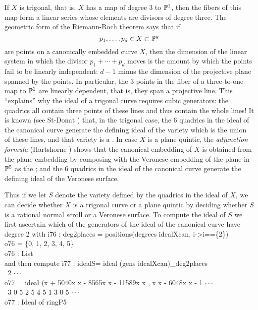 If $X$ is trigonal, that is, $X$ has a map of degree 3 to $\P^1$,
then the fibers of this map form a linear series whose elements
are divisors of degree three. The geometric form
of the Riemann-Roch theorem says that if 
$$
p_1,\dots,p_d\in X\subset \P^g
$$
are points on a canonically embedded curve $X$,
then the dimension of the linear system in which the divisor
$p_1+\cdots+p_d$ moves is the amount by which the points fail
to be linearly independent: $d-1$ minus the dimension of the 
projective plane spanned by the points.
In particular, the 3 points in the fiber of a three-to-one
map to $\P^1$ are linearly dependent, that is,
they span a projective line.
This ``explains'' why the ideal of a
trigonal curve requires cubic generators: the quadrics all 
contain three points of these lines and thus contain the whole
lines! It is known (see St-Donat \cite{s-d}) that, in the 
trigonal case, the 6 quadrics in the ideal of the canonical curve
generate the defining ideal of the variety which is the union of these
lines, and that variety is a .
In case $X$ is a plane quintic, the {\it adjunction formula\/}
(Hartshorne \cite[II.8.20.3]{Hartshorne}) 
shows that the canonical embedding of $X$ is
obtained from the plane embedding by composing with the Veronese
embedding of the plane in $\P^5$ as the ; 
and the 6 quadrics in the ideal
of the canonical curve generate the defining ideal of the
Veronese surface. 

Thus if we let $S$ denote the variety defined by the quadrics
in the ideal of $X$, we can decide whether $X$ is a 
trigonal curve or a plane quintic by deciding whether $S$ is
a rational normal scroll or a Veronese surface.
To compute the ideal of $S$ we first ascertain which
of the generators of the ideal of the canonical curve
have degree 2 with
\beginOutput
i76 : deg2places = positions(degrees idealXcan, i->i==\{2\})\\
\emptyLine
o76 = \{0, 1, 2, 3, 4, 5\}\\
\emptyLine
o76 : List\\
\endOutput
and then compute
\beginOutput
i77 : idealS= ideal (gens idealXcan)_deg2places\\
\emptyLine
\              2                                                        $\cdot\cdot\cdot$\\
o77 = ideal (x  + 5040x x  - 8565x x  - 11589x x , x x  - 6048x x  - 1 $\cdot\cdot\cdot$\\
\              3        0 5        2 5         4 5   1 3        0 5     $\cdot\cdot\cdot$\\
\emptyLine
o77 : Ideal of ringP5\\
\endOutput

